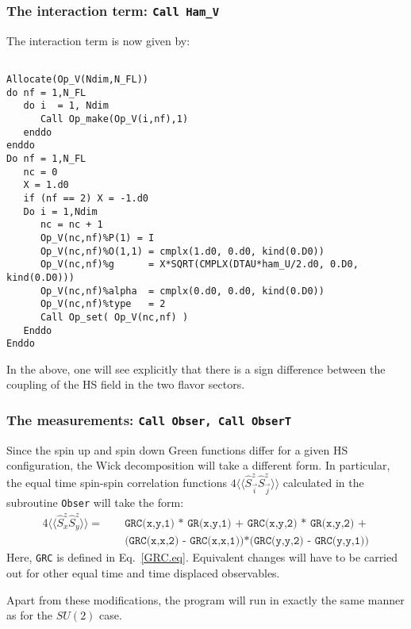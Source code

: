 \documentclass{SciPost}
\begin{document}
\subsubsection{The interaction term: \texttt{Call Ham\_V} } 
%
The interaction term is now given by: 

\begin{lstlisting}

Allocate(Op_V(Ndim,N_FL))
do nf = 1,N_FL
   do i  = 1, Ndim
      Call Op_make(Op_V(i,nf),1)
   enddo
enddo
Do nf = 1,N_FL
   nc = 0
   X = 1.d0
   if (nf == 2) X = -1.d0
   Do i = 1,Ndim
      nc = nc + 1
      Op_V(nc,nf)%P(1) = I
      Op_V(nc,nf)%O(1,1) = cmplx(1.d0, 0.d0, kind(0.D0))
      Op_V(nc,nf)%g      = X*SQRT(CMPLX(DTAU*ham_U/2.d0, 0.D0, kind(0.D0))) 
      Op_V(nc,nf)%alpha  = cmplx(0.d0, 0.d0, kind(0.D0))
      Op_V(nc,nf)%type   = 2
      Call Op_set( Op_V(nc,nf) )
   Enddo
Enddo

\end{lstlisting}
In the above, one will see explicitly that  there is a sign   difference between  the coupling of the HS field  in  the  two flavor sectors.  
%
 \subsubsection{The  measurements: \texttt{Call Obser, Call  ObserT} } 
%
 Since  the spin up and spin down Green functions differ  for a given HS configuration,  the Wick decomposition will take a different form. In particular, the  equal time spin-spin correlation functions 
 $ 4 \langle \langle \hat{S}^{z}_{\vec{i}}   \hat{S}^{z}_{\vec{j}} \rangle \rangle   $  calculated in the subroutine  \texttt{Obser}  will take the form: 
  \begin{eqnarray}
   4 \langle \langle \hat{S}^{z}_{x}   \hat{S}^{z}_{y} \rangle \rangle   =  & &  \texttt{  GRC(x,y,1) * GR(x,y,1) + GRC(x,y,2) * GR(x,y,2) + }  \nonumber \\ 
& & \texttt{   (GRC(x,x,2) - GRC(x,x,1))*(GRC(y,y,2) - GRC(y,y,1))}  \nonumber
  \end{eqnarray}
Here,  \texttt{GRC}  is defined in Eq.~\ref{GRC.eq}.  Equivalent changes will have to be carried out for other equal time and time displaced observables. 
  
Apart from these modifications, the program  will run in exactly the same manner as for the $SU(2)$ case. 
    
\end{document}
